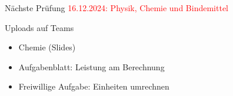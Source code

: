 \begin{frame}{Nächste Prüfung}
    \textcolor{red}{16.12.2024: Physik, Chemie und Bindemittel}
\end{frame}


\begin{frame}{Uploads auf Teams}
    \begin{itemize}
        \item [\textbullet] Chemie (Slides)
        \item [\textbullet] Aufgabenblatt: Leistung am Berechnung
        \item [\textbullet] Freiwillige Aufgabe: Einheiten umrechnen
    \end{itemize}
\end{frame}

\folieFragen


